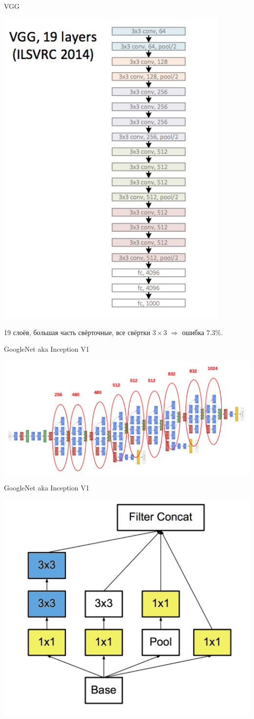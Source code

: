 \documentclass[notes,12pt, aspectratio=169]{beamer}
\newenvironment{wideitemize}{\itemize\addtolength{\itemsep}{10pt}}{\enditemize}
\begin{document}
\begin{frame}{VGG}
\begin{center}
\includegraphics[width=.3\linewidth]{vgg.png}
\end{center}

\begin{wideitemize}
\item  19 слоёв, большая часть свёрточные, все свёртки $3\times3$ $\Rightarrow$ ошибка $7.3\%$.
\end{wideitemize}
\end{frame}

\begin{frame}{GoogleNet aka Inception V1}
\begin{center}
\includegraphics[width=.9\linewidth]{inception.png}
\end{center}
\end{frame}

\begin{frame}{GoogleNet aka Inception V1}
\begin{center}
\includegraphics[width=.5\linewidth]{block.png}
\end{center}
\end{frame}
\end{document}

